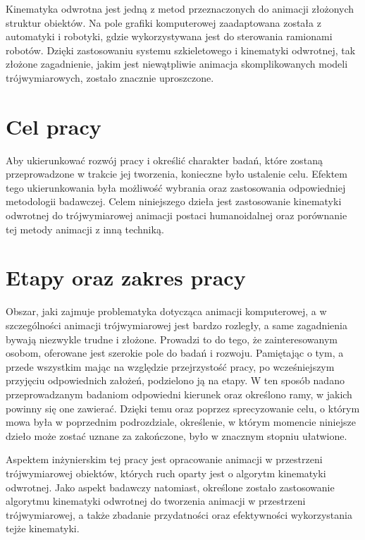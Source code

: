 \documentclass[11pt]{mwrep}
\begin{document}
Kinematyka odwrotna jest jedną z metod przeznaczonych do animacji złożonych struktur obiektów. Na pole grafiki komputerowej zaadaptowana została z automatyki i robotyki, gdzie wykorzystywana jest do sterowania ramionami robotów. Dzięki zastosowaniu systemu szkieletowego i kinematyki odwrotnej, tak złożone zagadnienie, jakim jest niewątpliwie animacja skomplikowanych modeli trójwymiarowych, zostało znacznie uproszczone.

  \section{Cel pracy}

  Aby ukierunkować rozwój pracy i określić charakter badań, które zostaną przeprowadzone w trakcie jej tworzenia, konieczne było ustalenie celu. Efektem tego ukierunkowania była możliwość wybrania oraz zastosowania odpowiedniej metodologii badawczej. Celem niniejszego dzieła jest zastosowanie kinematyki odwrotnej do trójwymiarowej animacji postaci humanoidalnej oraz porównanie tej metody animacji z inną techniką.

  \section{Etapy oraz zakres pracy}

  Obszar, jaki zajmuje problematyka dotycząca animacji komputerowej, a w szczególności animacji trójwymiarowej jest bardzo rozległy, a same zagadnienia bywają niezwykle trudne i złożone. Prowadzi to do tego, że zainteresowanym osobom, oferowane jest szerokie pole do badań i rozwoju. Pamiętając o tym, a przede wszystkim mając na względzie przejrzystość pracy, po wcześniejszym przyjęciu odpowiednich założeń, podzielono ją na etapy. W ten sposób nadano przeprowadzanym badaniom odpowiedni kierunek oraz określono ramy, w jakich powinny się one zawierać. Dzięki temu oraz poprzez sprecyzowanie celu, o którym mowa była w poprzednim podrozdziale, określenie, w którym momencie niniejsze dzieło może zostać uznane za zakończone, było w znacznym stopniu ułatwione.

  Aspektem inżynierskim tej pracy jest opracowanie animacji w przestrzeni trójwymiarowej obiektów, których ruch oparty jest o algorytm kinematyki odwrotnej. Jako aspekt badawczy natomiast, określone zostało zastosowanie algorytmu kinematyki odwrotnej do tworzenia animacji w przestrzeni trójwymiarowej, a także zbadanie przydatności oraz efektywności wykorzystania tejże kinematyki.
\end{document}

